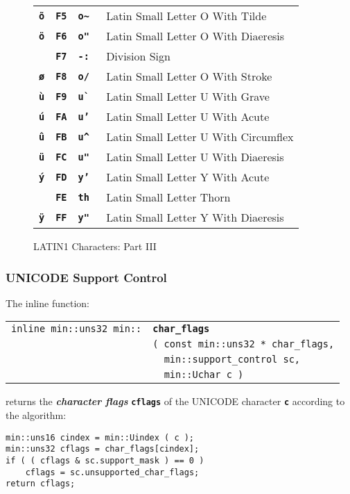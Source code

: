 \documentclass[12pt]{article}
\makeatletter
\newcommand{\TT}[1]{{\tt \bfseries #1}}
\newcommand{\skey}[2]{{\bf \em #1#2}\index{#1}}
\newcommand{\ttindex}[1]{\index{#1@{\tt #1}}}
\newlength{\figurewidth}
\newenvironment{boxedfigure}[1][!btp]%
	{\begin{figure*}[#1]
	 \begin{lrbox}{\figurebox}
	 \begin{minipage}{\figurewidth}

	 \vspace*{1ex}}%
	{
	 \vspace*{1ex}

	 \end{minipage}
	 \end{lrbox}

	 \centering
	 \fbox{\hspace*{0.1in}\usebox{\figurebox}\hspace*{0.1in}}
	 \end{figure*}}
\newenvironment{indpar}[1][0.3in]%
	{\begin{list}{}%
		     {\setlength{\itemsep}{0in}%
		      \setlength{\topsep}{0in}%
		      \setlength{\parsep}{1ex}%
		      \setlength{\labelwidth}{#1}%
		      \setlength{\leftmargin}{#1}%
		      \addtolength{\leftmargin}{\labelsep}}%
	 \item}%
	{\end{list}}
\newcommand{\LABEL}[1]{\label{#1}}
\newlength{\ARGBREAKLENGTH}
\newcommand{\ARGBREAK}[1][\ARGBREAKLENGTH]{\\&\hspace*{#1}}
\newcommand{\MINKEY}[1]%
	   {\TT{#1}\ttindex{min::#1}\ttindex{#1}}
\makeatother
\begin{document}
\begin{boxedfigure}
\begin{tabular}{llll}
\TT{\~o}
  & \TT{F5} & \TT{o\textasciitilde} & Latin Small Letter O With Tilde \\
\TT{\"o}
  & \TT{F6} & \TT{o"} & Latin Small Letter O With Diaeresis \\
\TT{\textdiv}
  & \TT{F7} & \TT{-:} & Division Sign \\
\TT{\o}
  & \TT{F8} & \TT{o/} & Latin Small Letter O With Stroke \\
\TT{\`u}
  & \TT{F9} & \TT{u\`~} & Latin Small Letter U With Grave \\
\TT{\'u}
  & \TT{FA} & \TT{u'} & Latin Small Letter U With Acute \\
\TT{\^u}
  & \TT{FB} & \TT{u\textasciicircum} & Latin Small Letter U With Circumflex \\
\TT{\"u}
  & \TT{FC} & \TT{u"} & Latin Small Letter U With Diaeresis \\
\TT{\'y}
  & \TT{FD} & \TT{y'} & Latin Small Letter Y With Acute \\
\TT{\th}
  & \TT{FE} & \TT{th} & Latin Small Letter Thorn \\
\TT{\"y}
  & \TT{FF} & \TT{y"} & Latin Small Letter Y With Diaeresis \\
\end{tabular}
\caption{LATIN1 Characters: Part III}
\label{LATIN1-CHARACTERS-III}
\end{boxedfigure}

\newpage

\subsubsection{UNICODE Support Control}
\label{UNICODE-SUPPORT-CONTROL}

The inline function:

\begin{indpar}\begin{tabular}{r@{}l}
\verb|inline min::uns32 min::| & \MINKEY{char\_flags}\ARGBREAK
      \verb|( const min::uns32 * char_flags,|\ARGBREAK
      \verb|  min::support_control sc,|\ARGBREAK
      \verb|  min::Uchar c )|
\LABEL{MIN::CHAR_FLAGS} \\
\end{tabular}\end{indpar}

returns the \skey{character flag}s \TT{cflags} of the UNICODE character
\TT{c} according to the algorithm:

\begin{indpar}\begin{verbatim}
min::uns16 cindex = min::Uindex ( c );
min::uns32 cflags = char_flags[cindex];
if ( ( cflags & sc.support_mask ) == 0 )
    cflags = sc.unsupported_char_flags;
return cflags;
\end{verbatim}\end{indpar}
\end{document}
